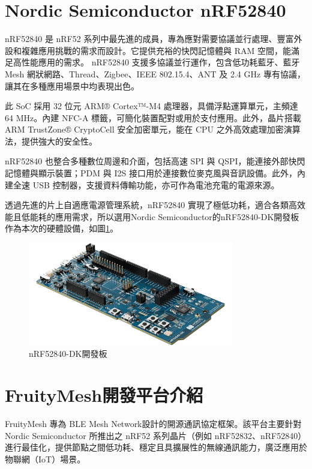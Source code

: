 \begin{ZhChapter}
\section{Nordic Semiconductor nRF52840}
nRF52840 是 nRF52 系列中最先進的成員，專為應對需要協議並行處理、豐富外設和複雜應用挑戰的需求而設計。它提供充裕的快閃記憶體與 RAM 空間，能滿足高性能應用的需求。
nRF52840 支援多協議並行運作，包含低功耗藍牙、藍牙 Mesh 網狀網路、Thread、Zigbee、IEEE 802.15.4、ANT 及 2.4 GHz 專有協議，讓其在多種應用場景中均表現出色。

此 SoC 採用 32 位元 ARM® Cortex™-M4 處理器，具備浮點運算單元，主頻達 64 MHz。內建 NFC-A 標籤，可簡化裝置配對或用於支付應用。此外，晶片搭載 ARM TrustZone® CryptoCell 安全加密單元，能在 CPU 之外高效處理加密演算法，提供強大的安全性。

nRF52840 也整合多種數位周邊和介面，包括高速 SPI 與 QSPI，能連接外部快閃記憶體與顯示裝置；PDM 與 I2S 接口用於連接數位麥克風與音訊設備。此外，內建全速 USB 控制器，支援資料傳輸功能，亦可作為電池充電的電源來源。

透過先進的片上自適應電源管理系統，nRF52840 實現了極低功耗，適合各類高效能且低能耗的應用需求，所以選用Nordic Semiconductor的nRF52840-DK開發板\cite{nordic2023softdevices}作為本次的硬體設備，如圖\ref{fig: nRF52840-DK開發板}。

\begin{figure}[H]
    \centering
    \includegraphics[width = 0.8\textwidth]{image/nRF52840-DK開發板.png}
    \caption{nRF52840-DK開發板}
    \label{fig: nRF52840-DK開發板}
\end{figure}

\section{FruityMesh開發平台介紹}
FruityMesh \cite{fruitymesh2023} 專為 BLE Mesh Network設計的開源通訊協定框架。該平台主要針對 Nordic Semiconductor 所推出之 nRF52 系列晶片（例如 nRF52832、nRF52840）進行最佳化，提供節點之間低功耗、穩定且具擴展性的無線通訊能力，廣泛應用於物聯網（IoT）場景。


\end{ZhChapter}
